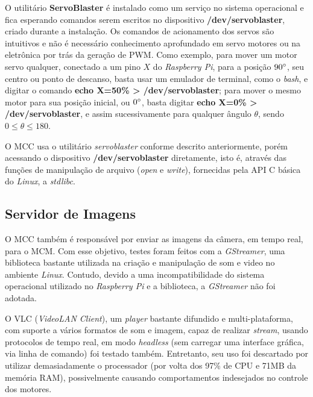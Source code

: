 O utilitário \textbf{ServoBlaster} é instalado como um serviço no sistema operacional e fica esperando comandos serem escritos no dispositivo \textbf{/dev/servoblaster}, criado durante a instalação. Os comandos de acionamento dos servos são intuitivos e não é necessário conhecimento aprofundado em servo motores ou na eletrônica por trás da geração de PWM. Como exemplo, para mover um motor servo qualquer, conectado a um pino $X$ do \textit{Raspberry Pi}, para a posição $90\degree$, seu centro ou ponto de descanso, basta usar um emulador de terminal, como o \textit{bash}, e digitar o comando \textbf{echo X=50\% > /dev/servoblaster}; para mover o mesmo motor para sua posição inicial, ou $0\degree$, basta digitar \textbf{echo X=0\% > /dev/servoblaster}, e assim sucessivamente para qualquer ângulo $\theta$, sendo $0 \le \theta \le 180$.\par

O MCC usa o utilitário \textit{servoblaster} conforme descrito anteriormente, porém acessando o dispositivo \textbf{/dev/servoblaster} diretamente, isto é, através das funções de manipulação de arquivo (\textit{open} e \textit{write}), fornecidas pela API C básica do \textit{Linux}, a \textit{stdlibc}.

\subsection{Servidor de Imagens}
\label{subsec:mediaserver}

O MCC também é responsável por enviar as imagens da câmera, em tempo real, para o MCM. Com esse objetivo, testes foram feitos com a \textit{GStreamer}, uma biblioteca bastante utilizada na criação e manipulação de som e video no ambiente \textit{Linux}. Contudo, devido a uma incompatibilidade do sistema operacional utilizado no \textit{Raspberry Pi} e a biblioteca, a \textit{GStreamer} não foi adotada.\par

O VLC (\textit{VideoLAN Client}), um \textit{player} bastante difundido e multi-plataforma, com suporte a vários formatos de som e imagem, capaz de realizar \textit{stream}, usando protocolos de tempo real, em modo \textit{headless} (sem carregar uma interface gráfica, via linha de comando) foi testado também. Entretanto, seu uso foi descartado por utilizar demasiadamente o processador (por volta dos 97\% de CPU e 71MB da memória RAM), possivelmente causando comportamentos indesejados no controle dos motores.\par

